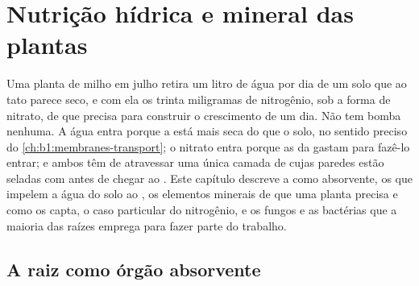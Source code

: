 \chapter{Nutrição hídrica e mineral das plantas}\label{ch:b1:plant-water-minerals}

Uma planta de milho em julho retira um litro de água por dia de um
solo que ao tato parece seco, e com ela os trinta miligramas de
nitrogênio, sob a forma de nitrato, de que precisa para construir o
crescimento de um dia. Não tem bomba nenhuma. A água entra porque a
 está mais seca do que o solo, no sentido preciso do
\cref{ch:b1:membranes-transport}; o nitrato entra porque as  da
 gastam  para fazê-lo entrar; e ambos têm de atravessar uma
única camada de  cujas paredes estão seladas com  antes de
chegar ao . Este capítulo descreve a  como  absorvente,
os  que impelem a água do solo ao , os
elementos minerais de que uma planta precisa e como os capta, o caso
particular do nitrogênio, e os fungos e as bactérias que a maioria das
raízes emprega para fazer parte do trabalho.

\section{A raiz como órgão absorvente}

